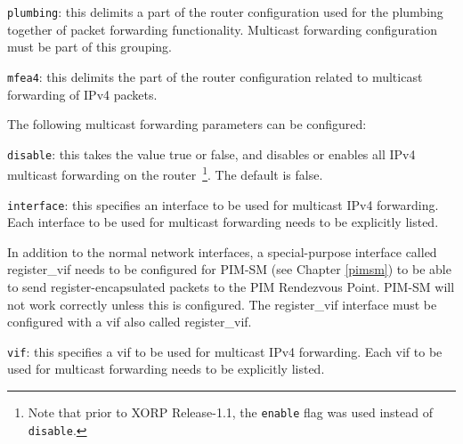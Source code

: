 \begin{description}
\begin{description}
\end{description}

\item{\tt plumbing}: this delimits a part of the router configuration
  used for the plumbing together of packet forwarding functionality.
  Multicast forwarding configuration must be part of this grouping.
\item{\tt mfea4}: this delimits the part of the router configuration
  related to multicast forwarding of IPv4 packets.

  The following multicast forwarding parameters can be configured:
\begin{description}
\item{\tt disable}: this takes the value {\stt true} or {\stt false},
  and disables or enables all IPv4 multicast forwarding on the
  router~\footnote{Note that prior to XORP Release-1.1, the {\tt enable}
  flag was used instead of {\tt disable}.}.
  The default is {\stt false}.
\item{\tt interface}: this specifies an interface to be used for
  multicast IPv4 forwarding.  Each interface to be used for multicast
  forwarding needs to be explicitly listed.

  In addition to the normal network interfaces, a special-purpose
  interface called {\stt register\_vif} needs to be configured for
  PIM-SM (see Chapter \ref{pimsm}) to be able to send
  register-encapsulated packets to the PIM Rendezvous Point.  PIM-SM
  will not work correctly unless this is configured.  The {\stt
  register\_vif} interface must be configured with a vif also called
  {\stt register\_vif}.
\item{\tt vif}: this specifies a vif to be used for multicast IPv4
  forwarding.  Each vif to be used for multicast forwarding needs to
  be explicitly listed.


\end{description}
\end{description}
